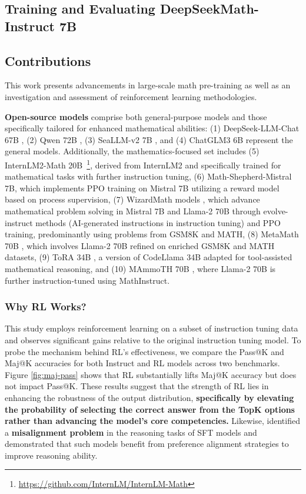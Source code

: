 \subsection{Training and Evaluating DeepSeekMath-Instruct 7B}

\subsection{Contributions}
This work presents advancements in large-scale math pre-training as well as an investigation and assessment of reinforcement learning methodologies.

\item \textbf{Open-source models} comprise both general-purpose models and those specifically tailored for enhanced mathematical abilities: (1) DeepSeek-LLM-Chat 67B \citep{deepseek-llm}, (2) Qwen 72B \citep{qwen}, (3) SeaLLM-v2 7B \citep{seallm}, and (4) ChatGLM3 6B \citep{chatglm3} represent the general models. Additionally, the mathematics-focused set includes (5) InternLM2-Math 20B~\footnote{\url{https://github.com/InternLM/InternLM-Math}}, derived from InternLM2 and specifically trained for mathematical tasks with further instruction tuning, (6) Math-Shepherd-Mistral 7B, which implements PPO training \citep{schulman2017proximal} on Mistral 7B \citep{mistral} utilizing a reward model based on process supervision, (7) WizardMath models \citep{wizardmath}, which advance mathematical problem solving in Mistral 7B and Llama-2 70B \citep{llama2} through evolve-instruct methods (AI-generated instructions in instruction tuning) and PPO training, predominantly using problems from GSM8K and MATH, (8) MetaMath 70B \citep{metamath}, which involves Llama-2 70B refined on enriched GSM8K and MATH datasets, (9) ToRA 34B \cite{tora}, a version of CodeLlama 34B adapted for tool-assisted mathematical reasoning, and (10) MAmmoTH 70B \citep{MathInstruct}, where Llama-2 70B is further instruction-tuned using MathInstruct.

\subsubsection{Why RL Works?} This study employs reinforcement learning on a subset of instruction tuning data and observes significant gains relative to the original instruction tuning model. To probe the mechanism behind RL’s effectiveness, we compare the Pass@K and Maj@K accuracies for both Instruct and RL models across two benchmarks. Figure \ref{fig:maj-pass} shows that RL substantially lifts Maj@K accuracy but does not impact Pass@K. These results suggest that the strength of RL lies in enhancing the robustness of the output distribution, \textbf{specifically by elevating the probability of selecting the correct answer from the TopK options rather than advancing the model’s core competencies.} Likewise, \citep{wang2023making} identified a \textbf{misalignment problem} in the reasoning tasks of SFT models and demonstrated that such models benefit from preference alignment strategies \citep{yuan2023rrhf,song2023preference,wang2023making} to improve reasoning ability.

